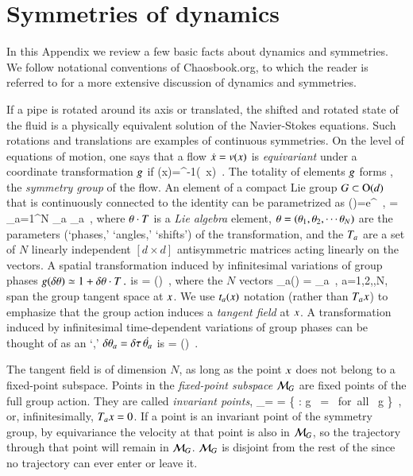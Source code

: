 \documentclass[preprint,12pt]{elsarticle} %
\begin{document}
\section{Symmetries of dynamics}
	\label{sec:SymmDyn}

In this Appendix we review a few basic facts about dynamics and
symmetries. We follow notational conventions of
Chaosbook.org, to which the reader is referred to for a more
extensive discussion of dynamics and symmetries.

If a pipe is rotated around its axis or translated, the shifted and
rotated state of the fluid is a physically equivalent solution of
the Navier-Stokes equations. Such rotations and translations
are examples of continuous symmetries. On the level of equations of
motion, one says that a flow $\dot{x}= v(x)$ is \emph{equivariant}
under a coordinate transformation $g$ if
\beq
\vel(x)=\LieEl^{-1}\vel(\LieEl \, x)
\,.
The totality of elements
$g$ forms \Group, the {\em symmetry group} of the flow.
An element of a compact Lie group $G \subset \textrm{O}(d)$ that is
continuously connected to the identity can be parametrized as
\beq
\LieEl(\gSpace)=e^{{\gSpace} \cdot \Lg }
    \,,\qquad
\gSpace \cdot \Lg = \sum_{a=1}^N \gSpace_a \Lg_a
\,,
where ${\bf \theta} \cdot T $ is a \emph{Lie algebra} element, ${\bf \theta} =
({\bf \theta}_1,{\bf \theta}_2,\cdots{\bf \theta}_N)$ are the parameters (`phases,'
`angles,' `shifts') of the transformation, and the $T_a$ are a set of
$N$ linearly independent $[d\!\times\!d]$ antisymmetric matrices acting
linearly on the {\statesp} vectors. A spatial transformation induced by
infinitesimal variations of group phases
$
g(\delta {\bf \theta}) \simeq 1 + \delta {\bf \theta} \cdot T
\,.
$ %
is
\beq
\delta {\ssp} = \delta \gSpace \cdot \groupTan(\ssp)
\,,
where the $N$ vectors
\beq
 \groupTan_{a}(\ssp) = \Lg _{a} \ssp
    \,,\qquad
 a=1,2,\cdots,N,
span the group tangent space at $x$. We use $t_a(x)$
notation (rather than $T_{a}x$) to emphasize that the group action
induces a \emph{tangent field} at $x$.
A transformation induced by infinitesimal
time-dependent variations  of group phases
can be thought of as an `{\angVel},'
$\delta {\bf \theta}_a = {\delta \tau} \, \dot{{\bf \theta}_a}$ is
\beq
\dot{\ssp} = \dot{\gSpace} \cdot \groupTan(\ssp)
\,.

The {tangent field} is of dimension $N$, as long as the point $x$ does
not belong to a fixed-point subspace. Points in the \emph{fixed-point
subspace}  ${\cal M}_{G}$ are fixed points of the full group action. They
are called \emph{invariant points},
\beq
\pS_\Group = \Fix{\Group} =
   \{ \ssp \in \pS : {g} \, \ssp = \ssp \mbox{ for all } g \in \Group \}
\,,
or, infinitesimally,  $T_{a}x=0$. If a point is an invariant point
of the symmetry group, by equivariance the velocity at that point is also
in ${\cal M}_{G}$, so the trajectory through that point will remain in
${\cal M}_{G}$. ${\cal M}_{G}$ is disjoint from the rest of the {\statesp}
since no trajectory can ever enter or leave it.
\end{document}
